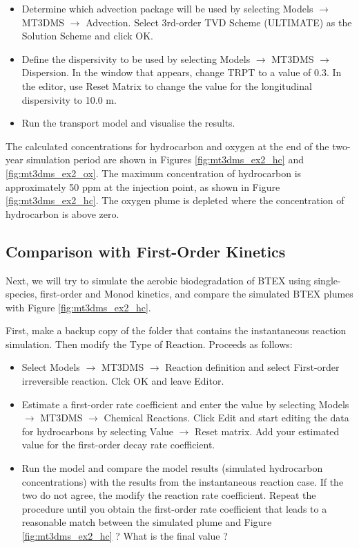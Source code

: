 \begin{itemize}
\item Determine which advection package will be used by selecting Models $\rightarrow$ MT3DMS $\rightarrow$ Advection. Select 3rd-order TVD Scheme (ULTIMATE) as the Solution Scheme and click OK.

\item Define the dispersivity to be used by selecting Models $\rightarrow$ MT3DMS $\rightarrow$ Dispersion. In the window that appears, change TRPT to a value of 0.3.
In the editor, use Reset Matrix to change the value for 
the longitudinal dispersivity to 10.0 m. 

\item Run the transport model and visualise the results.

\end{itemize}

The calculated concentrations for hydrocarbon and oxygen at the end of the two-year simulation
period are shown in Figures \ref{fig:mt3dms_ex2_hc} and \ref{fig:mt3dms_ex2_ox}. The maximum concentration of hydrocarbon is approximately 50
ppm at the injection point, as shown in Figure \ref{fig:mt3dms_ex2_hc}. 
The oxygen plume is depleted where the
concentration of hydrocarbon is above zero. 

\subsection{Comparison with First-Order Kinetics}

Next, we will try to simulate the aerobic biodegradation of BTEX using single-species, first-order and Monod kinetics, and compare the simulated BTEX plumes with Figure \ref{fig:mt3dms_ex2_hc}.

First, make a backup copy of the folder that contains the 
instantaneous reaction simulation. 
Then modify the Type of Reaction. Proceeds as follows:

\begin{itemize}

\item Select Models $\rightarrow$ MT3DMS $\rightarrow$ Reaction definition and
select First-order irreversible reaction. Clck OK and leave Editor.

\item  Estimate a first-order rate coefficient and enter the value 
by selecting Models $\rightarrow$ MT3DMS $\rightarrow$ 
Chemical Reactions. Click Edit and start editing the data for
hydrocarbons by selecting Value $\rightarrow$ Reset matrix.
Add your estimated value for the first-order decay rate coefficient.

\item  Run the model and compare the model results (simulated hydrocarbon 
concentrations) with the results from the instantaneous reaction case.
If the two do not agree, the modify the reaction rate coefficient.
Repeat the procedure until you obtain the first-order rate coefficient that leads to a
reasonable match between the simulated plume 
and Figure \ref{fig:mt3dms_ex2_hc} ? What is the final value ?

\end{itemize}

